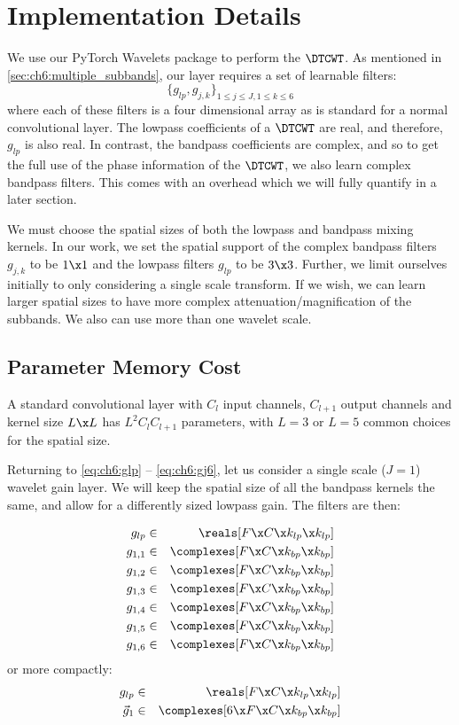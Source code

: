 \section{Implementation Details}

We use our PyTorch Wavelets package \cite{cotter_pytorch_2018} to perform the $\DTCWT$. As
mentioned in \autoref{sec:ch6:multiple_subbands}, our layer requires a set
of learnable filters:
\begin{equation}
  \{ g_{lp}, g_{j,k} \}_{1\leq j \leq J, 1\leq k\leq 6}
\end{equation}
where each of these filters is a four dimensional array as is standard for a
normal convolutional layer. The lowpass coefficients of a $\DTCWT$ are real, and
therefore, $g_{lp}$ is also real. In contrast, the bandpass coefficients are
complex, and so to get the full use of the phase information of the $\DTCWT$, we
also learn complex bandpass filters. This comes with an overhead which we will 
fully quantify in a later section.

We must choose the spatial sizes of both the lowpass and bandpass
mixing kernels. In our work, we set the spatial support of the complex bandpass
filters $g_{j,k}$ to be $1\x 1$ and the lowpass filters $g_{lp}$ to be $3\x 3$.
Further, we limit ourselves initially to only considering a single scale
transform.  
If we wish, we can learn larger spatial sizes to have more complex
attenuation/magnification of the subbands. We also can use more than
one wavelet scale. 


\subsection{Parameter Memory Cost}\label{sec:ch6:memory}
A standard convolutional layer with $C_l$ input channels, $C_{l+1}$ output channels
and kernel size $L\x L$ has $L^2C_{l}C_{l+1}$ parameters, with $L=3$ or $L=5$
common choices for the spatial size.

Returning to \eqref{eq:ch6:glp} -- \eqref{eq:ch6:gj6}, let us consider a single
scale ($J=1$) wavelet gain layer. We will keep the spatial size of all the bandpass
kernels the same, and allow for a differently sized lowpass gain. The filters
are then:

\begin{eqnarray*}
  g_{lp} &\in& \reals[F\x C\x k_{lp}\x k_{lp}] \\
  g_{1,1} &\in& \complexes[F\x C\x k_{bp}\x k_{bp}] \\
  g_{1,2} &\in& \complexes[F\x C\x k_{bp}\x k_{bp}] \\
  g_{1,3} &\in& \complexes[F\x C\x k_{bp}\x k_{bp}] \\
  g_{1,4} &\in& \complexes[F\x C\x k_{bp}\x k_{bp}] \\
  g_{1,5} &\in& \complexes[F\x C\x k_{bp}\x k_{bp}] \\
  g_{1,6} &\in& \complexes[F\x C\x k_{bp}\x k_{bp}] 
\end{eqnarray*}
%
or more compactly:
%
\begin{eqnarray*}
  g_{lp} &\in& \reals[F\x C\x k_{lp}\x k_{lp}] \\
  \vec{g}_{1} &\in& \complexes[6\x F\x C\x k_{bp}\x k_{bp}] 
\end{eqnarray*}

